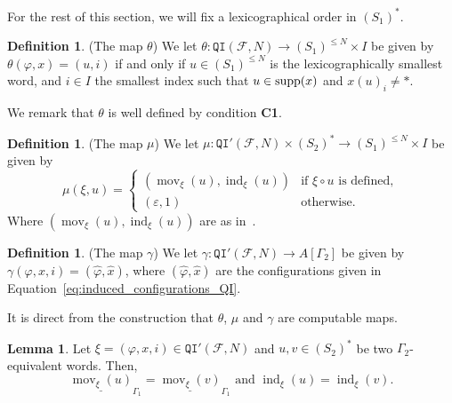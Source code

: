 \documentclass{article}
\theoremstyle{definition}
\newtheorem{lemma}[theorem]{Lemma}
\newtheorem{defn}[theorem]{Definition} %
\theoremstyle{definition}
\newcommand{\Fo}{\mathcal{F}}
\newcommand{\QI}{\mathtt{QI}}
\newcommand{\mov}{\operatorname{mov}}
\newcommand{\ind}{\operatorname{ind}}
\newcommand{\supp}{\textnormal{supp}}
\begin{document}
For the rest of this section, we will fix a lexicographical order in $(S_1)^*$.

\begin{defn}(The map $\theta$)
\label{def:theta}
    We let $\theta\colon \QI(\Fo,N) \to (S_1)^{\leq N} \times I$ be given by $\theta(\varphi,x) = (u,i)$ if and only if $u \in (S_1)^{\leq N}$ is the lexicographically smallest word, and $i \in I$ the smallest index such that $u \in \supp(x)$ and $x(u)_i \neq \ast$.
\end{defn}

We remark that $\theta$ is well defined by condition \textbf{C1}.

\begin{defn}(The map $\mu$)
\label{def:mu}
    We let $\mu\colon \QI'(\Fo,N)\times (S_2)^* \to (S_1)^{\leq N}\times I$ be given by \[ \mu(\xi,u) = \begin{cases}
        (\mov_{\xi}(u),\ind_{\xi}(u)) & \mbox{if } \xi \circ u \mbox{ is defined},\\
        (\varepsilon,1) & \mbox{otherwise.}
    \end{cases}  \] Where $(\mov_{\xi}(u),\ind_{\xi}(u))$ are as in~.
    
\end{defn}

\begin{defn}(The map $\gamma$)
\label{def:gamma}
    We let $\gamma\colon \QI'(\Fo,N) \to A[\Gamma_2]$ be given by $\gamma(\varphi,x,i) = (\widehat{\varphi},\widehat{x})$, where $(\widehat{\varphi},\widehat{x})$ are the configurations given in Equation~\eqref{eq:induced_configurations_QI}.
\end{defn}

It is direct from the construction that $\theta$, $\mu$ and $\gamma$ are computable maps.

\begin{lemma}\label{lem:movement_is_well_defined}
    Let ${\xi} = (\varphi,x,i) \in \QI'(\Fo,N)$ and $u,v\in (S_2)^*$ be two $\Gamma_2$-equivalent words. Then, $$\underline{\mov_{\xi}(u)}_{\Gamma_1} = \underline{\mov_{\xi}(v)}_{\Gamma_1} \mbox{ and } \ind_{\xi}(u) = \ind_{\xi}(v).$$
\end{lemma}
\end{document}
